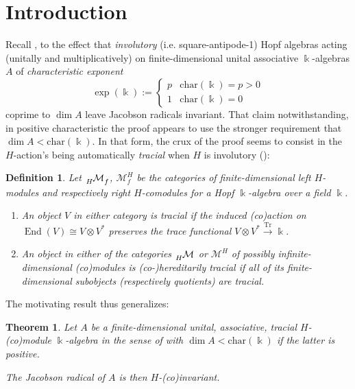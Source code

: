\documentclass[11pt,leqno]{article}
\theoremstyle{plain}
\newtheorem{theorem}[lemma]{Theorem}
\theoremstyle{plain}
\theoremstyle{plain}
\newtheorem{definition}[lemma]{Definition}
\numberwithin{equation}{section}
\theoremstyle{nonumberplain}
\newcommand\cM{{\mathcal M}}
\newcommand\1{{\bf 1}}
\DeclareMathOperator{\End}{\mathrm{End}}
\begin{document}
\section*{Introduction}

Recall \cite[Theorem 2.1]{MR1995055}, to the effect that \emph{involutory} (i.e. square-antipode-1) Hopf algebras acting (unitally and multiplicatively) on finite-dimensional unital associative $\Bbbk$-algebras $A$ of \emph{characteristic exponent} \cite[\S I.3.1]{brl}
\begin{equation*}
  \exp(\Bbbk)
  :=
  \begin{cases}
    p&\mathrm{char}(\Bbbk)=p>0\\
    1&\mathrm{char}(\Bbbk)=0
  \end{cases}
\end{equation*}
coprime to $\dim A$ leave Jacobson radicals invariant. That claim notwithstanding, in positive characteristic the proof appears \cite{gord_msg_involut} to use the stronger requirement that $\dim A<\mathrm{char}(\Bbbk)$. In that form, the crux of the proof seems to consist in the $H$-action's being automatically \emph{tracial} when $H$ is involutory ():

\begin{definition}\label{def:trcl.coact}
  Let $\tensor*[_H]{\cM}{_f}$, $\cM_f^H$ be the categories of finite-dimensional left $H$-modules and respectively right $H$-comodules for a Hopf $\Bbbk$-algebra over a field $\Bbbk$.

  \begin{enumerate}[(1),wide]
  \item An object $V$ in either category is \emph{tracial} if the induced (co)action on $\End(V)\cong V\otimes V^*$ preserves the trace functional $V\otimes V^*\xrightarrow{\mathrm{Tr}}\Bbbk$.

  \item An object in either of the categories $\tensor*[_H]{\cM}{}$ or $\cM^H$ of possibly infinite-dimensional (co)modules is \emph{(co-)hereditarily tracial} if all of its finite-dimensional subobjects (respectively quotients) are tracial.
  \end{enumerate}  
\end{definition}  
The motivating result thus generalizes:

\begin{theorem}\label{th:leaves.jac.inv}
  Let $A$ be a finite-dimensional unital, associative, tracial $H$-(co)module $\Bbbk$-algebra in the sense of  with $\dim A<\mathrm{char}(\Bbbk)$ if the latter is positive.

  The Jacobson radical of $A$ is then $H$-(co)invariant. 
\end{theorem}
\end{document}
